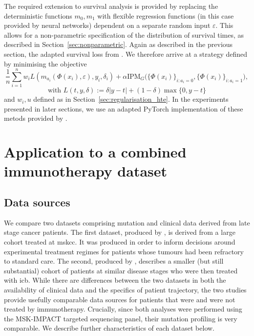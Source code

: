 \documentclass[../thesis.tex]{subfiles}
\begin{document}
The required extension to survival analysis is provided by replacing the deterministic functions $m_0, m_1$ with flexible regression functions (in this case provided by neural networks) dependent on a separate random input $\varepsilon$. This allows for a non-parametric specification of the distribution of survival times, as described in Section~\ref{sec:nonparametric}. Again as described in the previous section, the adapted survival loss from \citet{chapfuwa_adversarial_2018}. We therefore arrive at a strategy defined by minimising the objective 
\[\frac{1}{n}\sum_{i=1}^n w_i L(m_{a_i}(\Phi(x_i), \varepsilon), y_i, \delta_i) + \alpha \mathrm{IPM}_G\big(\{\Phi(x_i)\}_{i:a_i=0}, \{\Phi(x_i)\}_{i:a_i=1}\big),\]
\[\text{with } L(t, y, \delta) := \delta|y-t| + (1-\delta)\max\{0, y-t\} \]
and $w_i, u$ defined as in Section~\ref{sec:regularisation_hte}. In the experiments presented in later sections, we use an adapted PyTorch \citep{paszke_pytorch_2019} implementation of these metods provided by \citep{chapfuwa_enabling_2021}.

\section{Application to a combined immunotherapy dataset \label{sec:immuno_hte}}

\subsection{Data sources}

We compare two datasets comprising mutation and clinical data derived from late stage cancer patients. The first dataset, produced by \citet{zehir_mutational_2017}, is derived from a large cohort treated at \gls{mskcc}. It was produced in order to inform decisions around experimental treatment regimes for patients whose tumours had been refractory to standard care. The second, produced by \citet{hellmann_genomic_2018}, describes a smaller (but still substantial) cohort of patients at similar disease stages who were then treated with \gls{icb}. While there are differences between the two datasets in both the availability of clinical data and the specifics of patient trajectory, the two studies provide usefully comparable data sources for patients that were and were not treated by immunotherapy. Crucially, since both analyses were performed using the MSK-IMPACT targeted sequencing panel, their mutation profiling is very comparable. We describe further characteristics of each dataset below. 
\end{document}
